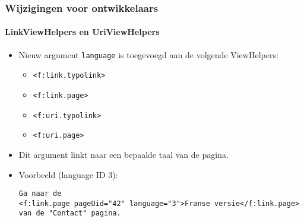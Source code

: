 
\begin{frame}[fragile]
	\frametitle{Wijzigingen voor ontwikkelaars}
	\framesubtitle{LinkViewHelpers en UriViewHelpers}

	\lstset{basicstyle=\tiny\ttfamily}

	\begin{itemize}
		\item Nieuw argument \texttt{language} is toegevoegd aan de volgende ViewHelpers:
			\begin{itemize}
				\item \texttt{<f:link.typolink>}
				\item \texttt{<f:link.page>}
				\item \texttt{<f:uri.typolink>}
				\item \texttt{<f:uri.page>}
			\end{itemize}

		\item Dit argument linkt naar een bepaalde taal van de pagina.
		\item Voorbeeld (language ID 3):
\begin{lstlisting}
Ga naar de
<f:link.page pageUid="42" language="3">Franse versie</f:link.page>
van de "Contact" pagina.
\end{lstlisting}

	\end{itemize}

\end{frame}


